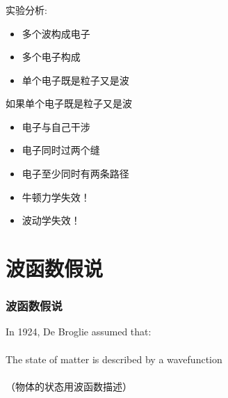 \begin{frame}
    \frametitle{}
    实验分析:\\
    \begin{itemize}
        \item 多个波构成电子 
        \item 多个电子构成 
        \item 单个电子既是粒子又是波 
    \end{itemize}
\end{frame}

\begin{frame}
    如果单个电子既是粒子又是波 \\
\begin{itemize}
    \item  电子与自己干涉 
    \item  电子同时过两个缝  
    \item  电子至少同时有两条路径 
    \item  牛顿力学失效！ 
    \item  波动学失效！ 
\end{itemize}
\end{frame}

\section{波函数假说}

\begin{frame}
    \frametitle{波函数假说}
    \begin{tcolorbox4}
    In 1924, De Broglie assumed that:\\
    ~\\
    The state of matter is described by a wavefunction \\
    ~\\
    （物体的状态用波函数描述）
    \end{tcolorbox4}
\end{frame}

